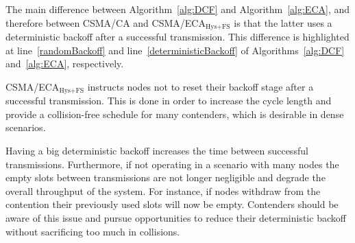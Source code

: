 The main difference between Algorithm~\ref{alg:DCF} and Algorithm~\ref{alg:ECA}, and therefore between CSMA/CA and CSMA/ECA$_{\text{Hys+FS}}$ is that the latter uses a deterministic backoff after a successful transmission. This difference is highlighted at line~\ref{randomBackoff} and line~\ref{deterministicBackoff} of Algorithms~\ref{alg:DCF} and~\ref{alg:ECA}, respectively.

CSMA/ECA$_{\text{Hys+FS}}$ instructs nodes not to reset their backoff stage after a successful transmission. This is done in order to increase the cycle length and provide a collision-free schedule for many contenders, which is desirable in dense scenarios.


Having a big deterministic backoff increases the time between successful transmissions. Furthermore, if not operating in a scenario with many nodes the empty slots between transmissions are not longer negligible and degrade the overall throughput of the system. For instance, if nodes withdraw from the contention their previously used slots will now be empty. Contenders should be aware of this issue and pursue opportunities to reduce their deterministic backoff without sacrificing too much in collisions. 

